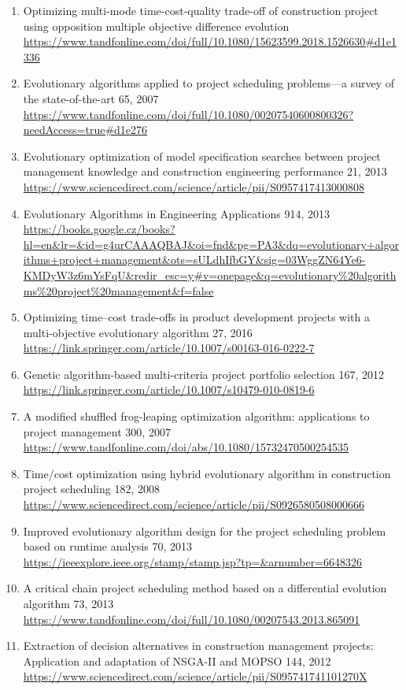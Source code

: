 \documentclass[a4paper,12pt]{article}
\begin{document}
\begin{enumerate}
  \item Optimizing multi-mode time-cost-quality trade-off of construction project using opposition multiple objective difference evolution \url{https://www.tandfonline.com/doi/full/10.1080/15623599.2018.1526630#d1e1336}
  \item Evolutionary algorithms applied to project scheduling problems—a survey of the state-of-the-art 65, 2007 \url{https://www.tandfonline.com/doi/full/10.1080/00207540600800326?needAccess=true#d1e276}
  \item Evolutionary optimization of model specification searches between project management knowledge and construction engineering performance 21, 2013 \url{https://www.sciencedirect.com/science/article/pii/S0957417413000808}
  \item Evolutionary Algorithms in Engineering Applications 914, 2013 \url{https://books.google.cz/books?hl=en&lr=&id=g4urCAAAQBAJ&oi=fnd&pg=PA3&dq=evolutionary+algorithms+project+management&ots=sULdhIfbGY&sig=03WggZN64Ye6-KMDyW3z6mYsFqU&redir_esc=y#v=onepage&q=evolutionary%20algorithms%20project%20management&f=false}
  \item Optimizing time–cost trade-offs in product development projects with a multi-objective evolutionary algorithm 27, 2016 \url{https://link.springer.com/article/10.1007/s00163-016-0222-7}
  \item Genetic algorithm-based multi-criteria project portfolio selection 167, 2012 \url{https://link.springer.com/article/10.1007/s10479-010-0819-6}
  \item A modified shuffled frog-leaping optimization algorithm: applications to project management 300, 2007 \url{https://www.tandfonline.com/doi/abs/10.1080/15732470500254535}
  \item Time/cost optimization using hybrid evolutionary algorithm in construction project scheduling 182, 2008 \url{https://www.sciencedirect.com/science/article/pii/S0926580508000666}
  \item Improved evolutionary algorithm design for the project scheduling problem based on runtime analysis 70, 2013 \url{https://ieeexplore.ieee.org/stamp/stamp.jsp?tp=&arnumber=6648326}
  \item A critical chain project scheduling method based on a differential evolution algorithm 73, 2013 \url{https://www.tandfonline.com/doi/full/10.1080/00207543.2013.865091}
  \item Extraction of decision alternatives in construction management projects: Application and adaptation of NSGA-II and MOPSO 144, 2012 \url{https://www.sciencedirect.com/science/article/pii/S095741741101270X}

\end{enumerate}
\end{document}
